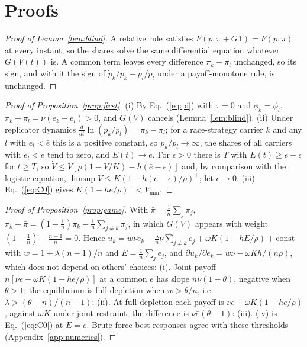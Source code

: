 \documentclass[letterpaper]{article} %
\theoremstyle{definition}
\newcommand{\Vmin}{V_{\min}}
\begin{document}


\appendix

\section{Proofs}\label{app:proofs}

\begin{proof}[Proof of Lemma~\ref{lem:blind}]
A relative rule satisfies $F(p,\pi+G\mathbf 1)=F(p,\pi)$ at every instant, so the shares solve the same differential equation whatever $G(V(t))$ is. A common term leaves every difference $\pi_k-\pi_l$ unchanged, so its sign, and with it the sign of $\dot p_k/p_k-\dot p_l/p_l$ under a payoff-monotone rule, is unchanged.
\end{proof}

\begin{proof}[Proof of Proposition~\ref{prop:first}]
(i) By Eq.~(\ref{eq:pi}) with $\tau=0$ and $\phi_k=\phi_l$, $\pi_k-\pi_l=\nu(e_k-e_l)>0$, and $G(V)$ cancels (Lemma~\ref{lem:blind}). (ii) Under replicator dynamics $\frac{d}{dt}\ln(p_k/p_l)=\pi_k-\pi_l$; for a race-strategy carrier $k$ and any $l$ with $e_l<\bar e$ this is a positive constant, so $p_k/p_l\to\infty$, the shares of all carriers with $e_l<\bar e$ tend to zero, and $E(t)\to\bar e$. For $\epsilon>0$ there is $T$ with $E(t)\ge\bar e-\epsilon$ for $t\ge T$, so $\dot V\le V[\rho(1-V/K)-h(\bar e-\epsilon)]$ and, by comparison with the logistic equation, $\limsup V\le K(1-h(\bar e-\epsilon)/\rho)^+$; let $\epsilon\to0$. (iii) Eq.~(\ref{eq:C0}) gives $K(1-h\bar e/\rho)^+<\Vmin$.
\end{proof}

\begin{proof}[Proof of Proposition~\ref{prop:game}]
With $\bar\pi=\frac1n\sum_j\pi_j$, $\pi_k-\bar\pi=(1-\frac1n)\pi_k-\frac1n\sum_{j\neq k}\pi_j$, in which $G(V)$ appears with weight $(1-\frac1n)-\frac{n-1}{n}=0$. Hence $u_k=w\nu e_k-\frac\lambda n\nu\sum_{j\ne k}e_j+\omega K(1-hE/\rho)+\text{const}$ with $w=1+\lambda(n-1)/n$ and $E=\frac1n\sum_je_j$, and $\partial u_k/\partial e_k=w\nu-\omega Kh/(n\rho)$, which does not depend on others' choices: (i). Joint payoff $n[\nu e+\omega K(1-he/\rho)]$ at a common $e$ has slope $n\nu(1-\theta)$, negative when $\theta>1$; the equilibrium is full depletion when $w>\theta/n$, i.e.\ $\lambda>(\theta-n)/(n-1)$: (ii). At full depletion each payoff is $\nu\bar e+\omega K(1-h\bar e/\rho)$, against $\omega K$ under joint restraint; the difference is $\nu\bar e(\theta-1)$: (iii). (iv) is Eq.~(\ref{eq:C0}) at $E=\bar e$. Brute-force best responses agree with these thresholds (Appendix~\ref{app:numerics}).
\end{proof}
\end{document}
